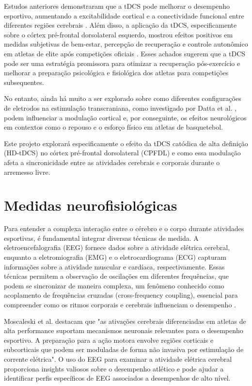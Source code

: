 Estudos anteriores demonstraram que a tDCS pode melhorar o desempenho esportivo, aumentando a excitabilidade cortical e a conectividade funcional entre diferentes regiões cerebrais \cite{okano2015brain, moreira2021effect_male, moreira2021effect_female}. Além disso, a aplicação da tDCS, especificamente sobre o córtex pré-frontal dorsolateral esquerdo, mostrou efeitos positivos em medidas subjetivas de bem-estar, percepção de recuperação e controle autonômico em atletas de elite após competições oficiais \cite{moreira2021effect_male, moreira2021effect_female}. Esses achados sugerem que a tDCS pode ser uma estratégia promissora para otimizar a recuperação pós-exercício e melhorar a preparação psicológica e fisiológica dos atletas para competições subsequentes.

No entanto, ainda há muito a ser explorado sobre como diferentes configurações de eletrodos na estimulação transcraniana, como investigado por Datta et al. \cite{datta2008transcranial}, podem influenciar a modulação cortical e, por conseguinte, os efeitos neurológicos em contextos como o repouso e o esforço físico em atletas de basquetebol.

Este projeto explorará especificamente o efeito da tDCS catódica de alta definição (HD-tDCS) no córtex pré-frontal dorsolateral (CPFDL) e como essa modulação afeta a sincronicidade entre as atividades cerebrais e corporais durante o arremesso livre.

\section{Medidas neurofisiológicas}
Para entender a complexa interação entre o cérebro e o corpo durante atividades esportivas, é fundamental integrar diversas técnicas de medida. A eletroencefalografia (EEG) fornece dados sobre a atividade elétrica cerebral, enquanto a eletromiografia (EMG) e o eletrocardiograma (ECG) capturam informações sobre a atividade muscular e cardíaca, respectivamente. Essas técnicas permitem a observação de oscilações em diferentes frequências, que podem se sincronizar de maneira complexa, um fenômeno conhecido como acoplamento de frequências cruzadas (cross-frequency coupling), essencial para compreender como os ritmos corporais e cerebrais influenciam o desempenho \cite{criscuolo2022cognition}.

Moscaleski et al. \cite{moscaleski2022hdtdcs} destacam que "as ativações cerebrais diferenciadas em atletas de alta performance suportam mecanismos neuronais relevantes para o desempenho esportivo. A preparação para a ação motora envolve regiões corticais e subcorticais que podem ser moduladas de forma não invasiva por estimulação de corrente elétrica". O uso do EEG para examinar a atividade elétrica cerebral proporciona insights valiosos sobre o desempenho atlético e pode ajudar a identificar perfis específicos de EEG associados a desempenhos de alto nível.

